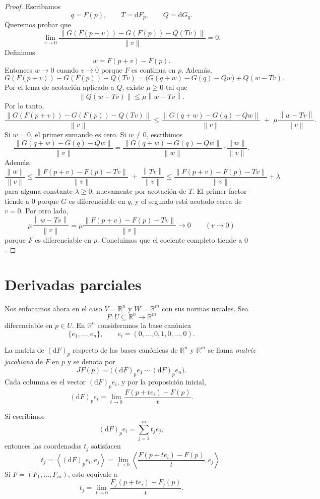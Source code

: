 \documentclass[11pt]{article}
\theoremstyle{definition}
\theoremstyle{remark}
\newcommand{\R}{\mathbb{R}}
\newcommand{\norm}[1]{\left\lVert #1 \right\rVert}
\newcommand{\dd}{\mathrm{d}}
\begin{document}
\begin{proof}
Escribamos
\[
q=F(p),\qquad T=\dd F_p,\qquad Q=\dd G_q.
\]
Queremos probar que
\[
\lim_{v\to 0}
\frac{\norm{G(F(p+v))-G(F(p))-Q(Tv)}}{\norm{v}}=0.
\]
Definimos
\[
w = F(p+v)-F(p).
\]
Entonces $w\to 0$ cuando $v\to 0$ porque $F$ es continua en $p$. Adem\'as,
\[
G(F(p+v))-G(F(p))-Q(Tv)
=
\bigl(G(q+w)-G(q)-Qw\bigr)+Q(w-Tv).
\]
Por el lema de acotaci\'on aplicado a $Q$, existe $\mu\ge 0$ tal que
\[
\norm{Q(w-Tv)}\le \mu \norm{w-Tv}.
\]
Por lo tanto,
\[
\frac{\norm{G(F(p+v))-G(F(p))-Q(Tv)}}{\norm{v}}
\le
\frac{\norm{G(q+w)-G(q)-Qw}}{\norm{v}}
\;+\;
\mu \frac{\norm{w-Tv}}{\norm{v}}.
\]
Si $w=0$, el primer sumando es cero. Si $w\neq 0$, escribimos
\[
\frac{\norm{G(q+w)-G(q)-Qw}}{\norm{v}}
=
\frac{\norm{G(q+w)-G(q)-Qw}}{\norm{w}}
\cdot
\frac{\norm{w}}{\norm{v}}.
\]
Adem\'as,
\[
\frac{\norm{w}}{\norm{v}}
\le
\frac{\norm{F(p+v)-F(p)-Tv}}{\norm{v}}
\;+\;
\frac{\norm{Tv}}{\norm{v}}
\le
\frac{\norm{F(p+v)-F(p)-Tv}}{\norm{v}}+\lambda
\]
para alguna constante $\lambda\ge 0$, nuevamente por acotaci\'on de $T$. El primer factor tiende a $0$ porque $G$ es diferenciable en $q$, y el segundo est\'a acotado cerca de $v=0$. Por otro lado,
\[
\mu \frac{\norm{w-Tv}}{\norm{v}}
=
\mu \frac{\norm{F(p+v)-F(p)-Tv}}{\norm{v}}
\longrightarrow 0
\qquad (v\to 0)
\]
porque $F$ es diferenciable en $p$. Concluimos que el cociente completo tiende a $0$.
\end{proof}

\section*{Derivadas parciales}

Nos enfocamos ahora en el caso $V=\R^n$ y $W=\R^m$ con sus normas usuales. Sea
\[
F \colon U \subseteq \R^n \to \R^m
\]
diferenciable en $p\in U$. En $\R^n$ consideramos la base can\'onica
\[
\{e_1,\dots,e_n\},
\qquad
e_i=(0,\dots,0,1,0,\dots,0).
\]

La matriz de $(\dd F)_p$ respecto de las bases can\'onicas de $\R^n$ y $\R^m$ se llama \emph{matriz jacobiana} de $F$ en $p$ y se denota por
\[
JF(p)
=
\bigl((\dd F)_p e_1 \ \cdots \ (\dd F)_p e_n\bigr).
\]
Cada columna es el vector $(\dd F)_p e_i$, y por la proposici\'on inicial,
\[
(\dd F)_p e_i
=
\lim_{t\to 0}\frac{F(p+t e_i)-F(p)}{t}.
\]

Si escribimos
\[
(\dd F)_p e_i = \sum_{j=1}^m t_j e_j,
\]
entonces las coordenadas $t_j$ satisfacen
\[
t_j
=
\left\langle (\dd F)_p e_i,e_j\right\rangle
=
\lim_{t\to 0}
\left\langle \frac{F(p+t e_i)-F(p)}{t},e_j\right\rangle.
\]
Si $F=(F_1,\dots,F_m)$, esto equivale a
\[
t_j
=
\lim_{t\to 0}\frac{F_j(p+t e_i)-F_j(p)}{t}.
\]
\end{document}
